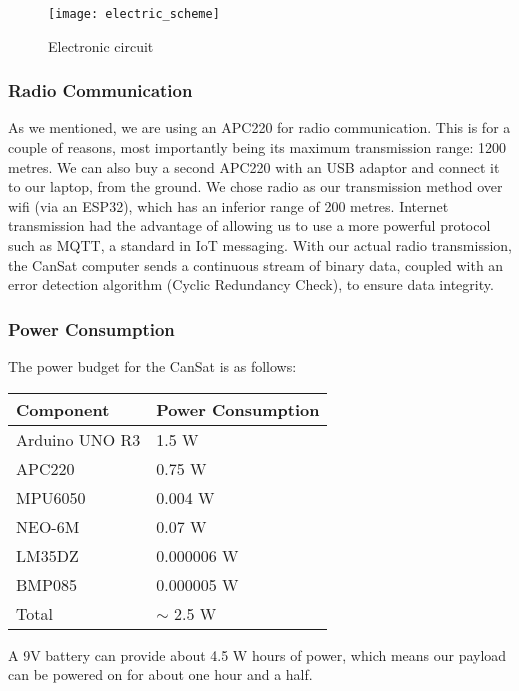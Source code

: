 \begin{figure}[H]
\centering
\texttt{[image: electric\_scheme]}
\caption{Electronic circuit}
\end{figure}

\subsubsection{Radio Communication}

As we mentioned, we are using an APC220 for radio communication. This is for a couple of reasons, most importantly being its maximum transmission range: 1200 metres. We can also buy a second APC220 with an USB adaptor and connect it to our laptop, from the ground. We chose radio as our transmission method over wifi (via an ESP32), which has an inferior range of 200 metres. Internet transmission had the advantage of allowing us to use a more powerful protocol such as MQTT, a standard in IoT messaging. With our actual radio transmission, the CanSat computer sends a continuous stream of binary data, coupled with an error detection algorithm (Cyclic Redundancy Check), to ensure data integrity.

\subsubsection{Power Consumption}

The power budget for the CanSat is as follows:

\begin{table}[H]
\centering
\begin{tabularx}{\textwidth}{|X|X|}
\hline
Component           & Power Consumption \\ \hline
Arduino UNO R3      & 1.5 W             \\
APC220              & 0.75 W            \\
MPU6050             & 0.004 W           \\
NEO-6M              & 0.07 W            \\
LM35DZ              & 0.000006 W        \\
BMP085              & 0.000005 W         \\ \hline
Total               & $ \sim $ 2.5 W     \\ \hline
\end{tabularx}
\end{table}

A 9V battery can provide about 4.5 W hours of power, which means our payload can be powered on for about one hour and a half.

